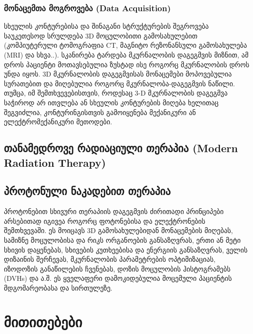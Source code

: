 \documentclass[12pt,a4paper,]{report}
\begin{document}
\subsection{მონაცემთა მოგროვება (Data Acquisition)}
სხეულის კონტურებისა და შინაგანი სტრუქტურების შეგროვება საუკეთესოდ სრულდება 3D მოცულობითი გამოსახულებით (კომპიუტერული ტომოგრაფია CT, მაგნიტო რეზონანსული გამოსახულება (MRI) და სხვა..). სკანირება ტარდება მკურნალობის დაგეგმვის მიზნით, ამ დროს პაციენტი მოთავსებულია ზუსტად ისე როგორც მკურნალობის დროს უნდა იყოს. 3D მკურნალობის დაგეგმვისას მონაცემები მოპოვებულია სურათებით და მიღებულია როგორც მკურნალობა-დაგეგმვის ნაწილი. თუმცა, იმ შემთხვევებისთვის, როდესაც 3-D მკურნალობის დაგეგმვა საჭიროდ არ ითვლება ან სხეულის კონტურების მიღება ხელითაც შეგვიძლია, კონტურინგისთვის გამოიყენება მექანიკური ან ელექტრომექანიკური მეთოდები.

\section{თანამედროვე რადიაციული თერაპია (Modern Radiation Therapy)}


\section{პროტონული ნაკადებით თერაპია}
პროტონებით სხივური თერაპიის დაგეგმვის ძირითადი პრინციპები არსებითად იგივეა როგორც ფოტონებისა და ელექტრონების შემთხვევაში. ეს მოიცავს 3D გამოსახულებიდან მონაცემების მიღებას, სამიზნე მოცულობისა და რიკს ორგანოების განსაზღვრას, ერთი ან მეტი სხივის დაყენებას, სხივების კუთხეებისა და ენერგიის განსაზღვრას, ველის დიზაინის შერჩევას, მკურნალობის პარამეტრების ოპტიმიზაციას, იზოდოზის განაწილების ჩვენებას, დოზის მოცულობის ჰისტოგრამებს (DVHs)  და ა.შ. ეს ყველაფერი დამოკიდებულია მოცემული პაციენტის მდგომარეობასა და სირთულეზე.
\medskip


\chapter{მითითებები}

 
\end{document}
